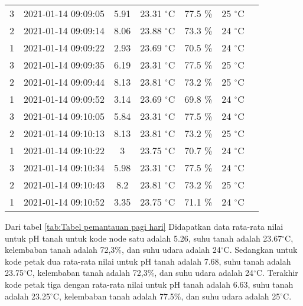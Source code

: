 \begin{itemize}
\begin{table}[H]
\begin{tabular}{ccccccc}
                    3 & 2021-01-14 09:09:05 &  5.91 & 23.31 $^{\circ}$C & 77.5 \% & 25 $^{\circ}$C   \\  
                    2 & 2021-01-14 09:09:14  &  8.06 & 23.88 $^{\circ}$C & 73.3 \% & 24 $^{\circ}$C \\  
                    1 & 2021-01-14 09:09:22  &  2.93 & 23.69 $^{\circ}$C & 70.5 \% & 24 $^{\circ}$C  \\  
                    3 & 2021-01-14 09:09:35 &  6.19 & 23.31 $^{\circ}$C & 77.5 \% & 25 $^{\circ}$C   \\  
                     2 & 2021-01-14 09:09:44  &  8.13 & 23.81 $^{\circ}$C & 73.2 \% & 25 $^{\circ}$C \\  
                     1 & 2021-01-14 09:09:52 &  3.14 & 23.69 $^{\circ}$C & 69.8 \% & 24 $^{\circ}$C  \\  
                    3 & 2021-01-14 09:10:05 &  5.84 & 23.31 $^{\circ}$C & 77.5 \% & 24 $^{\circ}$C   \\  
                    2 & 2021-01-14 09:10:13 &  8.13 & 23.81 $^{\circ}$C & 73.2 \% & 25 $^{\circ}$C   \\  
                    1 & 2021-01-14 09:10:22  &  3 & 23.75 $^{\circ}$C & 70.7 \% & 24 $^{\circ}$C \\  
                    3 & 2021-01-14 09:10:34 &  5.98 & 23.31 $^{\circ}$C & 77.5 \% & 24 $^{\circ}$C   \\  
                    2 & 2021-01-14 09:10:43  &  8.2 & 23.81 $^{\circ}$C & 73.2 \% & 25 $^{\circ}$C  \\  
                    1 & 2021-01-14 09:10:52   &  3.35 & 23.75 $^{\circ}$C & 71.1 \% & 24 $^{\circ}$C\\  
                    
            		\bottomrule
            	\end{tabular} 
            \end{table}
            
            Dari tabel \ref{tab:Tabel pemantauan pagi hari} Didapatkan data rata-rata nilai untuk pH tanah untuk kode node satu adalah 5.26, suhu tanah adalah 23.67$^{\circ}$C, kelembaban tanah adalah 72,3\%, dan suhu udara adalah 24$^{\circ}$C. Sedangkan untuk kode petak dua rata-rata nilai untuk pH tanah adalah 7.68, suhu tanah adalah 23.75$^{\circ}$C, kelembaban tanah adalah 72,3\%, dan suhu udara adalah 24$^{\circ}$C. Terakhir kode petak tiga dengan rata-rata nilai untuk pH tanah adalah 6.63, suhu tanah adalah 23.25$^{\circ}$C, kelembaban tanah adalah 77.5\%, dan suhu udara adalah 25$^{\circ}$C.
       \end{itemize}


